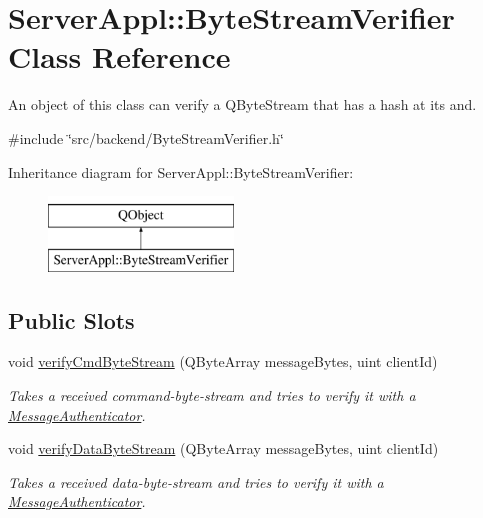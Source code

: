 \hypertarget{class_server_appl_1_1_byte_stream_verifier}{}\section{Server\+Appl\+:\+:Byte\+Stream\+Verifier Class Reference}
\label{class_server_appl_1_1_byte_stream_verifier}


An object of this class can verify a Q\+Byte\+Stream that has a hash at its and.  




{\ttfamily \#include \char`\"{}src/backend/\+Byte\+Stream\+Verifier.\+h\char`\"{}}

Inheritance diagram for Server\+Appl\+:\+:Byte\+Stream\+Verifier\+:\begin{figure}[H]
\begin{center}
\leavevmode
\includegraphics[height=2.000000cm]{class_server_appl_1_1_byte_stream_verifier}
\end{center}
\end{figure}
\subsection*{Public Slots}
\begin{DoxyCompactItemize}
\item 
void \hyperlink{class_server_appl_1_1_byte_stream_verifier_a580a6e8280f572ba4ce307e6b7a74be7}{verify\+Cmd\+Byte\+Stream} (Q\+Byte\+Array message\+Bytes, uint client\+Id)
\begin{DoxyCompactList}\small\item\em Takes a received command-\/byte-\/stream and tries to verify it with a \hyperlink{class_message_authenticator}{Message\+Authenticator}. \end{DoxyCompactList}\item 
void \hyperlink{class_server_appl_1_1_byte_stream_verifier_a9bc013d62bfe7ff2c597465ae062459f}{verify\+Data\+Byte\+Stream} (Q\+Byte\+Array message\+Bytes, uint client\+Id)
\begin{DoxyCompactList}\small\item\em Takes a received data-\/byte-\/stream and tries to verify it with a \hyperlink{class_message_authenticator}{Message\+Authenticator}. \end{DoxyCompactList}\end{DoxyCompactItemize}
